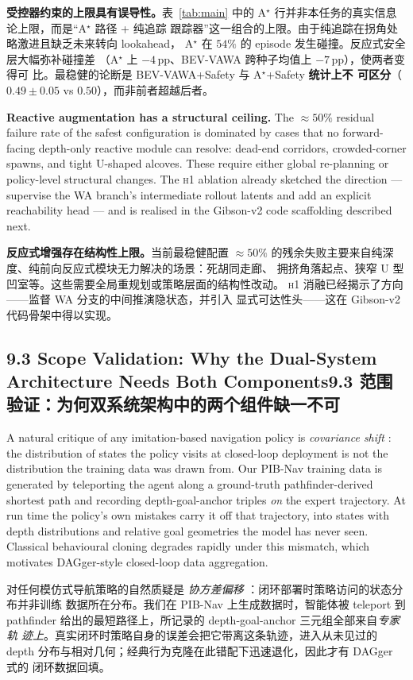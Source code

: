 \documentclass[11pt,a4paper]{article}
\providecommand{\citep}[1]{\cite{#1}}
\newcommand{\en}[1]{\par\noindent #1\par\vspace{0.15em}}
\newcommand{\zh}[1]{\par\noindent\color{zhcol}\hspace{0.5em}#1\par\color{black}\vspace{0.6em}}
\newcommand{\bisubsec}[2]{\subsection[#1]{#1\quad\normalfont\small\color{zhcol}\textsf{#2}}}
\begin{document}
\zh{\textsf{\textbf{受控器约束的上限具有误导性。}表~\ref{tab:main} 中的
A$^\star$ 行并非本任务的真实信息论上限，而是“A$^\star$ 路径 + 纯追踪
跟踪器”这一组合的上限。由于纯追踪在拐角处略激进且缺乏未来转向 lookahead，
A$^\star$ 在 $54\%$ 的 episode 发生碰撞。反应式安全层大幅弥补碰撞差
（A$^\star$ 上 $-4$\,pp、BEV-VAWA 跨种子均值上 $-7$\,pp），使两者变得可
比。最稳健的论断是 BEV-VAWA+Safety 与 A$^\star$+Safety \textbf{统计上不
可区分}（$0.49\pm 0.05$ vs $0.50$），而非前者超越后者。}}

\en{\textbf{Reactive augmentation has a structural ceiling.} The
$\approx 50\%$ residual failure rate of the safest configuration is
dominated by cases that no forward-facing depth-only reactive module can
resolve: dead-end corridors, crowded-corner spawns, and tight U-shaped
alcoves. These require either global re-planning or policy-level
structural changes. The \textsc{h1} ablation already sketched the
direction — supervise the WA branch's intermediate rollout latents
and add an explicit reachability head — and is realised in the Gibson-v2
code scaffolding described next.}

\zh{\textsf{\textbf{反应式增强存在结构性上限。}当前最稳健配置 $\approx 50\%$
的残余失败主要来自纯深度、纯前向反应式模块无力解决的场景：死胡同走廊、
拥挤角落起点、狭窄 U 型凹室等。这些需要全局重规划或策略层面的结构性改动。
\textsc{h1} 消融已经揭示了方向——监督 WA 分支的中间推演隐状态，并引入
显式可达性头——这在 Gibson-v2 代码骨架中得以实现。}}

\bisubsec{9.3 Scope Validation: Why the Dual-System Architecture Needs
Both Components}
{9.3 范围验证：为何双系统架构中的两个组件缺一不可}

\en{A natural critique of any imitation-based navigation policy is
\emph{covariance shift} \citep{AndersonOnEvaluation2018}: the
distribution of states the policy visits at closed-loop deployment is not
the distribution the training data was drawn from. Our PIB-Nav training
data is generated by teleporting the agent along a ground-truth
pathfinder-derived shortest path and recording depth-goal-anchor triples
\emph{on} the expert trajectory. At run time the policy's own mistakes
carry it off that trajectory, into states with depth distributions and
relative goal geometries the model has never seen. Classical behavioural
cloning degrades rapidly under this mismatch, which motivates DAGger-style
closed-loop data aggregation.}

\zh{\textsf{对任何模仿式导航策略的自然质疑是 \emph{协方差偏移}
\citep{AndersonOnEvaluation2018}：闭环部署时策略访问的状态分布并非训练
数据所在分布。我们在 PIB-Nav 上生成数据时，智能体被 teleport 到 pathfinder
给出的最短路径上，所记录的 depth-goal-anchor 三元组全部来自\emph{专家轨
迹上}。真实闭环时策略自身的误差会把它带离这条轨迹，进入从未见过的 depth
分布与相对几何；经典行为克隆在此错配下迅速退化，因此才有 DAGger 式的
闭环数据回填。}}
\end{document}
